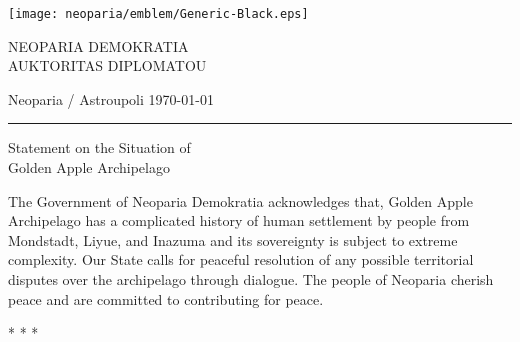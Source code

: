 \documentclass[a4paper,12pt]{article}
\newcommand{\makehead}[4]{
    \begin{minipage}{\linewidth}
        \center
        \sffamily
        \small
        {\hfill{\texttt{[image: neoparia/emblem/Generic-Black.eps]}}\hfill}
        \vspace{6mm}

        \MakeTextUppercase{#1}
        \vspace{11mm}
    \end{minipage}

    {\sffamily\footnotesize #3 \hfill #4}%

    \vspace{2mm}
    \hrule
    \vspace{15mm}

    \begin{minipage}{\linewidth}
        \center
        \sffamily
        \Large
        #2
        \vspace{12mm}
    \end{minipage}
    
    
    \rmfamily
}
\newcommand{\makeeof}[0]{
    \vspace{9mm}
    \begin{minipage}{\linewidth}
        \center
        * * *
    \end{minipage}
}
\begin{document}
\pagestyle{empty}
\makehead{Neoparia Demokratia\\Auktoritas Diplomatou}{Statement on the Situation of\\ Golden Apple Archipelago}{Neoparia / Astroupoli}{\today}

The Government of Neoparia Demokratia acknowledges that,
Golden Apple Archipelago has a complicated history of human settlement \textemdash{} by people from Mondstadt, Liyue, and Inazuma \textemdash{}
and its sovereignty is subject to extreme complexity.
Our State calls for peaceful resolution of any possible territorial disputes over the archipelago through dialogue.
The people of Neoparia cherish peace and are committed to contributing for peace.

\makeeof
\end{document}
